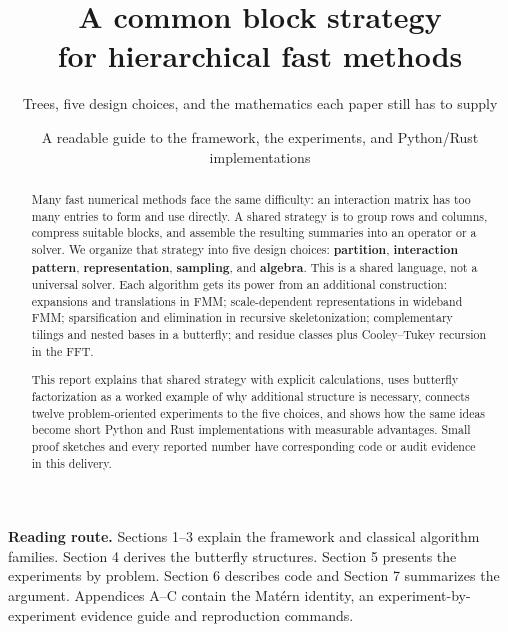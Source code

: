 \documentclass[11pt,a4paper]{article}
\title{\vspace{-8mm}\LARGE\bfseries A common block strategy\\[3pt]for hierarchical fast methods\bigskip}
\author{\large Trees, five design choices, and the mathematics each paper still has to supply}
\date{\large A readable guide to the framework, the experiments, and Python/Rust implementations}
\begin{document}
\maketitle
\thispagestyle{fancy}
\begin{abstract}
\noindent
Many fast numerical methods face the same difficulty: an interaction matrix has too many entries to form and use directly. A shared strategy is to group rows and columns, compress suitable blocks, and assemble the resulting summaries into an operator or a solver. We organize that strategy into five design choices: \textbf{partition}, \textbf{interaction pattern}, \textbf{representation}, \textbf{sampling}, and \textbf{algebra}. This is a shared language, not a universal solver. Each algorithm gets its power from an additional construction: expansions and translations in FMM; scale-dependent representations in wideband FMM; sparsification and elimination in recursive skeletonization; complementary tilings and nested bases in a butterfly; and residue classes plus Cooley--Tukey recursion in the FFT.

This report explains that shared strategy with explicit calculations, uses butterfly factorization as a worked example of why additional structure is necessary, connects twelve problem-oriented experiments to the five choices, and shows how the same ideas become short Python and Rust implementations with measurable advantages. Small proof sketches and every reported number have corresponding code or audit evidence in this delivery.
\end{abstract}
\vspace{3mm}
\noindent\textbf{Reading route.} Sections 1--3 explain the framework and classical algorithm families. Section 4 derives the butterfly structures. Section 5 presents the experiments by problem. Section 6 describes code and Section 7 summarizes the argument. Appendices A--C contain the Matérn identity, an experiment-by-experiment evidence guide and reproduction commands.
\tableofcontents
\clearpage




\appendix

\end{document}
